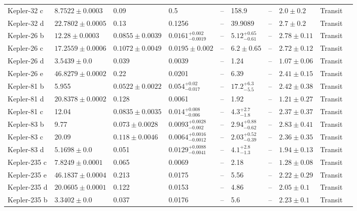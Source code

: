 \begin{tabular}{llllllllll}
Kepler-32 c & $8.7522 \pm 0.0003$ & 0.09 & 0.5 & -- & 158.9 & -- & $2.0 \pm 0.2$ & Transit & \cite{FABRYCKY_ET_AL__2012} \\
Kepler-32 d & $22.7802 \pm 0.0005$ & 0.13 & 0.1256 & -- & 39.9089 & -- & $2.7 \pm 0.2$ & Transit & \cite{FABRYCKY_ET_AL__2012} \\
Kepler-26 b & $12.28 \pm 0.0003$ & $0.0855 \pm 0.0039$ & $0.0161^{+0.002}_{-0.0019}$ & -- & $5.12^{+0.65}_{-0.61}$ & -- & $2.78 \pm 0.11$ & Transit & \cite{JONTOF_HUTTER_ET_AL__2016} \\
Kepler-26 c & $17.2559 \pm 0.0006$ & $0.1072 \pm 0.0049$ & $0.0195 \pm 0.002$ & -- & $6.2 \pm 0.65$ & -- & $2.72 \pm 0.12$ & Transit & \cite{JONTOF_HUTTER_ET_AL__2016} \\
Kepler-26 d & $3.5439 \pm 0.0$ & 0.039 & 0.0039 & -- & 1.24 & -- & $1.07 \pm 0.06$ & Transit & \cite{ROWE_ET_AL__2014} \\
Kepler-26 e & $46.8279 \pm 0.0002$ & 0.22 & 0.0201 & -- & 6.39 & -- & $2.41 \pm 0.15$ & Transit & \cite{ROWE_ET_AL__2014} \\
Kepler-81 b & 5.955 & $0.0522 \pm 0.0022$ & $0.054^{+0.02}_{-0.017}$ & -- & $17.2^{+6.3}_{-5.5}$ & -- & $2.42 \pm 0.38$ & Transit & \cite{XIE_2013} \\
Kepler-81 d & $20.8378 \pm 0.0002$ & 0.128 & 0.0061 & -- & 1.92 & -- & $1.21 \pm 0.27$ & Transit & \cite{ROWE_ET_AL__2014} \\
Kepler-81 c & 12.04 & $0.0835 \pm 0.0035$ & $0.014^{+0.008}_{-0.006}$ & -- & $4.3^{+2.7}_{-1.8}$ & -- & $2.37 \pm 0.37$ & Transit & \cite{XIE_2013} \\
Kepler-83 b & 9.77 & $0.073 \pm 0.0028$ & $0.0093^{+0.0028}_{-0.002}$ & -- & $2.94^{+0.88}_{-0.62}$ & -- & $2.83 \pm 0.41$ & Transit & \cite{XIE_2013} \\
Kepler-83 c & 20.09 & $0.118 \pm 0.0046$ & $0.0064^{+0.0016}_{-0.0012}$ & -- & $2.03^{+0.52}_{-0.39}$ & -- & $2.36 \pm 0.35$ & Transit & \cite{XIE_2013} \\
Kepler-83 d & $5.1698 \pm 0.0$ & 0.051 & $0.0129^{+0.0088}_{-0.0041}$ & -- & $4.1^{+2.8}_{-1.3}$ & -- & $1.94 \pm 0.13$ & Transit & \cite{ROWE_ET_AL__2014} \\
Kepler-235 c & $7.8249 \pm 0.0001$ & 0.065 & 0.0069 & -- & 2.18 & -- & $1.28 \pm 0.08$ & Transit & \cite{ROWE_ET_AL__2014} \\
Kepler-235 e & $46.1837 \pm 0.0004$ & 0.213 & 0.0175 & -- & 5.56 & -- & $2.22 \pm 0.29$ & Transit & \cite{ROWE_ET_AL__2014} \\
Kepler-235 d & $20.0605 \pm 0.0001$ & 0.122 & 0.0153 & -- & 4.86 & -- & $2.05 \pm 0.1$ & Transit & \cite{ROWE_ET_AL__2014} \\
Kepler-235 b & $3.3402 \pm 0.0$ & 0.037 & 0.0176 & -- & 5.6 & -- & $2.23 \pm 0.1$ & Transit & \cite{ROWE_ET_AL__2014} \\
\bottomrule
\end{tabular}
